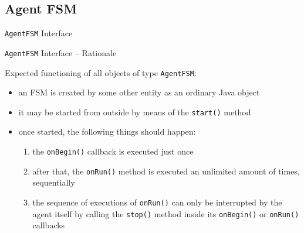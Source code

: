 \documentclass[presentation]{beamer}\mode<presentation>{\usetheme{AMSCesenaPurpleAndGold}}
\begin{document}
\subsection{Agent FSM}

\begin{frame}[allowframebreaks]{\texttt{AgentFSM} Interface}

    

\end{frame}

\begin{frame}[allowframebreaks]{\texttt{AgentFSM} Interface -- Rationale}



    Expected functioning of all objects of type \alert{\texttt{AgentFSM}}:
    \bigskip
    \begin{itemize}
        \item an FSM is created by some other entity as an ordinary Java object

        \bigskip

        \item it may be started from outside by means of the \texttt{\alert{start()}} method

        \bigskip

        \item once started, the following things should happen:
        \begin{enumerate}
            \item the \texttt{\alert{onBegin()}} callback is executed \alert{just once}

            \item \alert{after} that, the \texttt{\alert{onRun()}} method is executed an \alert{unlimited} amount of times, sequentially

            \item the sequence of executions of \texttt{onRun()} can only be interrupted by the agent itself by calling the \texttt{\alert{stop()}} method inside its \texttt{onBegin()} or \texttt{onRun()} callbacks
        \end{enumerate}

        \framebreak


\end{itemize}
\end{frame}
\end{document}
